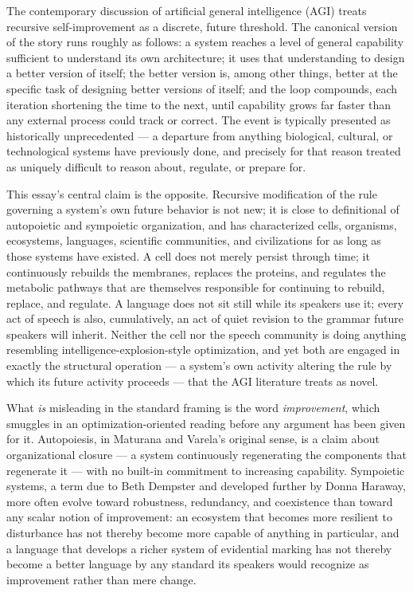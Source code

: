 \documentclass[11pt,a4paper]{article}
\theoremstyle{plain}
\theoremstyle{definition}
\theoremstyle{remark}
\begin{document}
The contemporary discussion of artificial general intelligence (AGI) treats recursive self-improvement as a discrete, future threshold. The canonical version of the story runs roughly as follows: a system reaches a level of general capability sufficient to understand its own architecture; it uses that understanding to design a better version of itself; the better version is, among other things, better at the specific task of designing better versions of itself; and the loop compounds, each iteration shortening the time to the next, until capability grows far faster than any external process could track or correct. The event is typically presented as historically unprecedented — a departure from anything biological, cultural, or technological systems have previously done, and precisely for that reason treated as uniquely difficult to reason about, regulate, or prepare for.

This essay's central claim is the opposite. Recursive modification of the rule governing a system's own future behavior is not new; it is close to definitional of autopoietic and sympoietic organization, and has characterized cells, organisms, ecosystems, languages, scientific communities, and civilizations for as long as those systems have existed. A cell does not merely persist through time; it continuously rebuilds the membranes, replaces the proteins, and regulates the metabolic pathways that are themselves responsible for continuing to rebuild, replace, and regulate. A language does not sit still while its speakers use it; every act of speech is also, cumulatively, an act of quiet revision to the grammar future speakers will inherit. Neither the cell nor the speech community is doing anything resembling intelligence-explosion-style optimization, and yet both are engaged in exactly the structural operation — a system's own activity altering the rule by which its future activity proceeds — that the AGI literature treats as novel.

What \emph{is} misleading in the standard framing is the word \emph{improvement}, which smuggles in an optimization-oriented reading before any argument has been given for it. Autopoiesis, in Maturana and Varela's original sense, is a claim about organizational closure — a system continuously regenerating the components that regenerate it — with no built-in commitment to increasing capability. Sympoietic systems, a term due to Beth Dempster and developed further by Donna Haraway, more often evolve toward robustness, redundancy, and coexistence than toward any scalar notion of improvement: an ecosystem that becomes more resilient to disturbance has not thereby become more capable of anything in particular, and a language that develops a richer system of evidential marking has not thereby become a better language by any standard its speakers would recognize as improvement rather than mere change.
\end{document}
